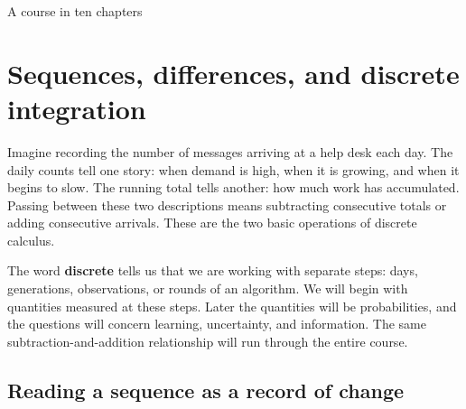 \documentclass[11pt,oneside,openany]{book}
\theoremstyle{definition}
\theoremstyle{remark}
\numberwithin{equation}{chapter}
\begin{document}
\begin{titlepage}\color{ink}\centering\vspace*{1.0in}{\small\sffamily PROBABILITY AND MATHEMATICAL MODELLING\par}\vspace{.45in}{\Huge\bfseries Discrete Information\\[.12in]Geometry\par}\vspace{.35in}{\Large Finite Differences, Probability,\\and Information Flows\par}\vspace{1cm}{\Large Chapter 1\par}\vfill{}\vfill{\large A course in ten chapters\par}\end{titlepage}
\setcounter{chapter}{0}

\chapter{Sequences, differences, and discrete integration}
Imagine recording the number of messages arriving at a help desk each day. The daily counts tell one story: when demand is high, when it is growing, and when it begins to slow. The running total tells another: how much work has accumulated. Passing between these two descriptions means subtracting consecutive totals or adding consecutive arrivals. These are the two basic operations of discrete calculus.

The word \textbf{discrete} tells us that we are working with separate steps: days, generations, observations, or rounds of an algorithm. We will begin with quantities measured at these steps. Later the quantities will be probabilities, and the questions will concern learning, uncertainty, and information. The same subtraction-and-addition relationship will run through the entire course.

\section{Reading a sequence as a record of change}\label{ch01-reading-a-sequence-as-a-record-of-change}
\end{document}
